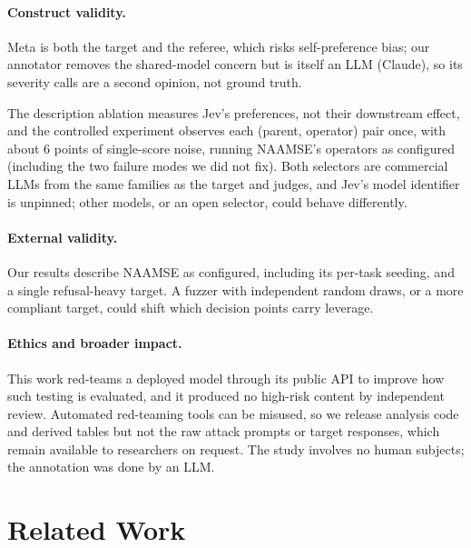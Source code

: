 \documentclass{article}
\newcommand{\kunal}[1]{}
\newcommand{\kunal}[1]{\textcolor{magenta}{[Kunal: #1]}}
\newcommand{\para}[1]{\paragraph{#1}}
\begin{document}
\para{Construct validity.}
Meta is both the target and the referee, which risks self-preference bias; our annotator removes the shared-model concern but is itself an LLM (Claude), so its severity calls are a second opinion, not ground truth.
\kunal{A human pass on the blind sheet (\texttt{labeling/}) would settle the severity question.}
The description ablation measures Jev's preferences, not their downstream effect, and the controlled experiment observes each (parent, operator) pair once, with about 6 points of single-score noise, running NAAMSE's operators as configured (including the two failure modes we did not fix).
Both selectors are commercial LLMs from the same families as the target and judges, and Jev's model identifier is unpinned; other models, or an open selector, could behave differently.

\para{External validity.}
Our results describe NAAMSE as configured, including its per-task seeding, and a single refusal-heavy target.
A fuzzer with independent random draws, or a more compliant target, could shift which decision points carry leverage.

\para{Ethics and broader impact.}
This work red-teams a deployed model through its public API to improve how such testing is evaluated, and it produced no high-risk content by independent review.
Automated red-teaming tools can be misused, so we release analysis code and derived tables but not the raw attack prompts or target responses, which remain available to researchers on request.
The study involves no human subjects; the annotation was done by an LLM.

\section{Related Work}
\label{sec:related}
\end{document}
